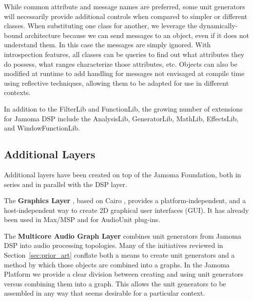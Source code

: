 \documentclass[twoside,10pt]{article}
\begin{document}
While common attribute and message names are preferred, some unit generators will necessarily provide additional controls when compared to simpler or different classes.  When substituting one class for another, we leverage the dynamically-bound architecture because we can send messages to an object, even if it does not understand them.  In this case the messages are simply ignored.  With introspection features, all classes can be queries to find out what attributes they do possess, what ranges characterize those attributes, etc.  Objects can also be modified at runtime to add handling for messages not envisaged at compile time using reflective techniques, allowing them to be adapted for use in different contexts.

In addition to the FilterLib and FunctionLib, the growing number of extensions for Jamoma DSP include the AnalysisLib, GeneratorLib, MathLib, EffectsLib, and WindowFunctionLib.




\subsection{Additional Layers} %

Additional layers have been created on top of the Jamoma Foundation, both in series and in parallel with the DSP layer.  

The \textbf{Graphics Layer} \cite{web10}, based on Cairo \cite{web11}, provides a platform-independent, and a host-independent way to create 2D graphical user interfaces (GUI). It has already been used in Max/MSP and for AudioUnit plug-ins.

The \textbf{Multicore Audio Graph Layer} \cite{web12} combines unit generators from Jamoma DSP into audio processing topologies.  Many of the initiatives reviewed in Section~\ref{sec:prior_art} conflate both a means to create unit generators and a method by which those objects are combined into a graphs.  In the Jamoma Platform we provide a clear division between creating and using unit generators versus combining them into a graph.  This allows the unit generators to be assembled in any way that seems desirable for a particular context.
\end{document}
